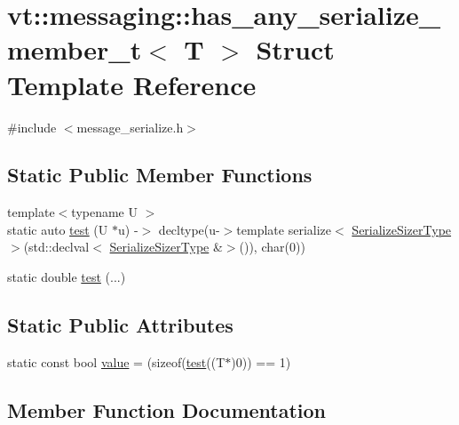 \hypertarget{structvt_1_1messaging_1_1has__any__serialize__member__t}{}\section{vt\+:\+:messaging\+:\+:has\+\_\+any\+\_\+serialize\+\_\+member\+\_\+t$<$ T $>$ Struct Template Reference}
\label{structvt_1_1messaging_1_1has__any__serialize__member__t}


{\ttfamily \#include $<$message\+\_\+serialize.\+h$>$}

\subsection*{Static Public Member Functions}
\begin{DoxyCompactItemize}
\item 
{\footnotesize template$<$typename U $>$ }\\static auto \hyperlink{structvt_1_1messaging_1_1has__any__serialize__member__t_a6090c486385f0c86be2ff51d2304c4a7}{test} (U $\ast$u) -\/$>$ decltype(u-\/$>$template serialize$<$ \hyperlink{namespacevt_1_1messaging_ad46de1ccda6ed95e8bb11e85c28be878}{Serialize\+Sizer\+Type} $>$(std\+::declval$<$ \hyperlink{namespacevt_1_1messaging_ad46de1ccda6ed95e8bb11e85c28be878}{Serialize\+Sizer\+Type} \&$>$()), char(0))
\item 
static double \hyperlink{structvt_1_1messaging_1_1has__any__serialize__member__t_a1a258eb4994a16e4359a9c1c21d71de7}{test} (...)
\end{DoxyCompactItemize}
\subsection*{Static Public Attributes}
\begin{DoxyCompactItemize}
\item 
static const bool \hyperlink{structvt_1_1messaging_1_1has__any__serialize__member__t_ae0ddceb2b8168f1c6abe7d51c10ac984}{value} = (sizeof(\hyperlink{structvt_1_1messaging_1_1has__any__serialize__member__t_a6090c486385f0c86be2ff51d2304c4a7}{test}((T$\ast$)0)) == 1)
\end{DoxyCompactItemize}


\subsection{Member Function Documentation}
\mbox{\label{structvt_1_1messaging_1_1has__any__serialize__member__t_a6090c486385f0c86be2ff51d2304c4a7}} 
